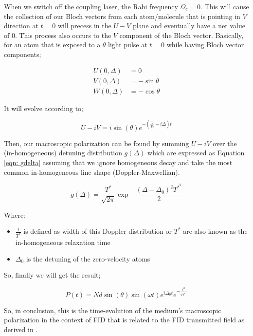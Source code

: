 When we switch off the coupling laser, the Rabi frequency $\Omega_{c} = 0$. This will cause the collection of our Bloch vectors from each atom/molecule that is pointing in $V$ direction at $t  = 0$ will precess in the $U-V$ plane and eventually have a net value of 0. This process also occurs to the $V$ component of the Bloch vector. Basically, for an atom that is exposed to a $\theta$ light pulse at $t = 0$ while having Bloch vector components;

\begin{align}
    U(0, \Delta) &= 0\\
    V(0, \Delta) &= -\sin{\theta} \label{eqn: V}\\
    W(0, \Delta) &= -\cos{\theta} \label{eqn: W}
\end{align}

It will evolve according to;

\begin{equation}
    U - iV = i \sin({\theta}) e^{-(\frac{1}{T_{2}} - i \Delta)t}
\end{equation}

Then, our macroscopic polarization can be found by summing $U- iV$ over the (in-homogeneous) detuning distribution $g(\Delta)$ which are expressed as Equation \ref{eqn: gdelta} assuming that we ignore homogeneous decay and take the most common in-homogeneous line shape (Doppler-Maxwellian).

\begin{equation}
    g(\Delta) = \frac{T^{*}}{\sqrt{2\pi}} \exp{-\frac{(\Delta - \Delta_{0})^{2} T^{*^{2}}}{2}}
    \label{eqn: gdelta}
\end{equation}

Where:

\begin{itemize}
    \item $\frac{1}{T^{*}}$ is defined as width of this Doppler distribution or $T^{*}$ are also known as the in-homogeneous relaxation time
    \item $\Delta_{0}$ is the detuning of the zero-velocity atoms
\end{itemize}

So, finally we will get the result;

\begin{equation}
    P(t) = N d \sin{(\theta)} \sin{(\omega t)} e^{i \Delta_{0} t} e^{-\frac{t^{2}}{2 T^{*^{2}}}}
\end{equation}

So, in conclusion, this is the time-evolution of the medium's macroscopic polarization in the context of FID that is related to the FID transmitted field as derived in \cite{Chen2010}.

